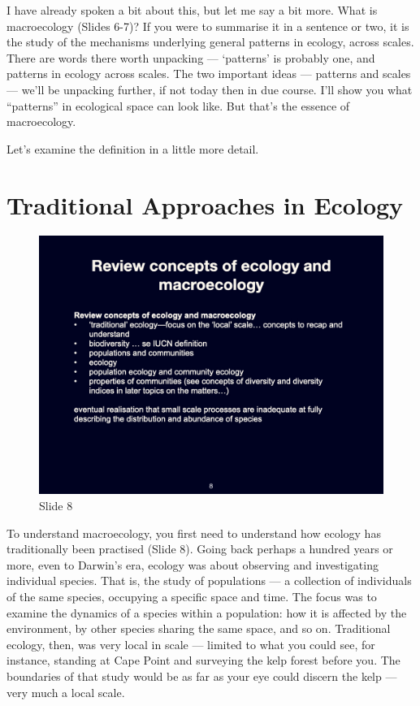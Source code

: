 \documentclass[
  11pt,
]{book}
\begin{document}
I have already spoken a bit about this, but let me say a bit more. What
is macroecology (Slides 6-7)? If you were to summarise it in a sentence
or two, it is the study of the mechanisms underlying general patterns in
ecology, across scales. There are words there worth unpacking ---
`patterns' is probably one, and patterns in ecology across scales. The
two important ideas --- patterns and scales --- we'll be unpacking
further, if not today then in due course. I'll show you what
``patterns'' in ecological space can look like. But that's the essence
of macroecology.

Let's examine the definition in a little more detail.

\section{Traditional Approaches in
Ecology}\label{traditional-approaches-in-ecology}

\begin{figure}[ht]
\centering
\includegraphics[width=0.8\linewidth]{../images/BDC334/BDC334-008.jpeg}
\caption*{Slide 8}
\end{figure}

To understand macroecology, you first need to understand how ecology has
traditionally been practised (Slide 8). Going back perhaps a hundred
years or more, even to Darwin's era, ecology was about observing and
investigating individual species. That is, the study of populations ---
a collection of individuals of the same species, occupying a specific
space and time. The focus was to examine the dynamics of a species
within a population: how it is affected by the environment, by other
species sharing the same space, and so on. Traditional ecology, then,
was very local in scale --- limited to what you could see, for instance,
standing at Cape Point and surveying the kelp forest before you. The
boundaries of that study would be as far as your eye could discern the
kelp --- very much a local scale.
\end{document}
